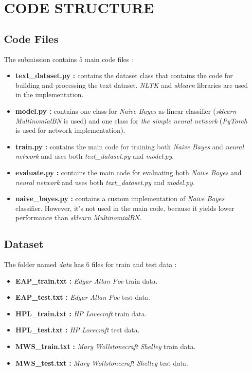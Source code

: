 \documentclass[letterpaper, 10 pt, conference]{ieeeconf}  %
\begin{document}

\section{CODE STRUCTURE}
\subsection{Code Files}
The submission contains $5$ main code files :
\begin{itemize}
    \item \textbf{text\_dataset.py :} contains the dataset class that contains the code for building and processing the text dataset. \emph{NLTK} and \emph{sklearn} libraries are used in the implementation.
    \item \textbf{model.py :} contains one class for \emph{Naive Bayes} as linear classifier (\emph{sklearn MultinomialBN} is used) and one class for \emph{the simple neural network} (\emph{PyTorch} is used for network implementation).
    \item \textbf{train.py :} contains the main code for training both \emph{Naive Bayes} and \emph{neural network} and uses both \emph{text\_dataset.py} and \emph{model.py}.
    \item \textbf{evaluate.py :} contains the main code for evaluating both \emph{Naive Bayes} and \emph{neural network} and uses both \emph{text\_dataset.py} and \emph{model.py}.
    \item \textbf{naive\_bayes.py :} contains a custom implementation of \emph{Naive Bayes} classifier. However, it's not used in the main code, because it yields lower performance than \emph{sklearn MultinomialBN}.
\end{itemize}

\subsection{Dataset}
The folder named \emph{data} has $6$ files for train and test data :
\begin{itemize}
    \item \textbf{EAP\_train.txt :} \emph{Edgar Allan Poe} train data.
    \item \textbf{EAP\_test.txt :} \emph{Edgar Allan Poe} test data.
    \item \textbf{HPL\_train.txt :} \emph{HP Lovecraft} train data.
    \item \textbf{HPL\_test.txt :} \emph{HP Lovecraft} test data.
    \item \textbf{MWS\_train.txt :} \emph{Mary Wollstonecraft Shelley} train data.
    \item \textbf{MWS\_test.txt :} \emph{Mary Wollstonecraft Shelley} test data.
\end{itemize}
\end{document}
